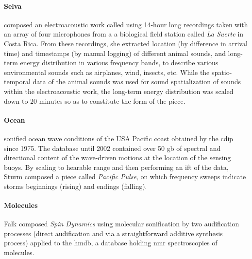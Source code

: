 \documentclass[
]{book}
\begin{document}
\paragraph{Selva}
\textcite{icmc/bbp2372.2000.123} composed an electroacoustic work called  \parencite{Bar20:Viv} using 14-hour long recordings taken with an array of four microphones from a a biological field station called \textit{La Suerte} in Costa Rica. From these recordings, she extracted location (by difference in arrival time) and timestamps (by manual logging) of different animal sounds, and long-term energy distribution in various frequency bands, to describe various environmental sounds such as airplanes, wind, insects, etc. While the spatio-temporal data of the animal sounds was used for sound spatialization of sounds within the electroacoustic work, the long-term energy distribution was scaled down to 20 minutes so as to constitute the form of the piece.

\paragraph{Ocean}
\textcite{icmc/bbp2372.2002.056} sonified ocean wave conditions of the USA Pacific coast obtained by the \gls{cdip} since 1975. The database until 2002 contained over 50 \gls{gb} of spectral and directional content of the wave-driven motions at the location of the sensing buoys. By scaling to hearable range and then performing an \gls{ift} of the data, Sturm composed a piece called \textit{Pacific Pulse}, on which frequency sweeps indicate storms beginnings (rising) and endings (falling).

\paragraph{Molecules}
Falk \textcite{icmc/bbp2372.2016.002} composed \textit{Spin Dynamics} using molecular sonification by two audification processes (direct audification and via a straightforward additive synthesis process) applied to the \gls{hmdb}, a database holding \gls{nmr} spectroscopies of molecules.


\end{document}
